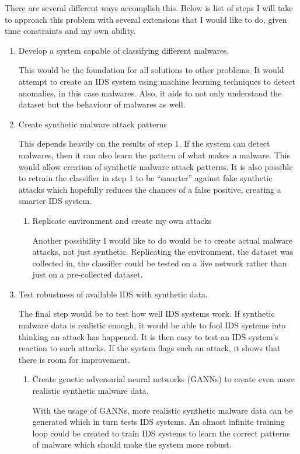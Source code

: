 \documentclass[11pt]{article}
\begin{document}
There are several different ways accomplish this. Below is list of steps I will take to approach this problem with several extensions that I would like to do, given time constraints and my own ability. 

\begin{enumerate}
  \item Develop a system capable of classifying different malwares. 
  
 This would be the foundation for all solutions to other problems. It would attempt to create an IDS system using machine learning techniques to detect anomalies, in this case malwares. Also, it aids to not only understand the dataset but the behaviour of malwares as well. 

  \item Create synthetic malware attack patterns

  This depends heavily on the results of step 1. If the system can detect malwares, then it can also learn the pattern of what makes a malware. This would allow creation of synthetic malware attack patterns. It is also possible to retrain the classifier in step 1 to be “smarter” against fake synthetic attacks which hopefully reduces the chances of a false positive, creating a smarter IDS system. 

  \begin{enumerate}
    \item{Replicate environment and create my own attacks}

   Another possibility I would like to do would be to create actual malware attacks, not just synthetic. Replicating the environment, the dataset was collected in, the classifier could be tested on a live network rather than just on a pre-collected dataset. 
  \end{enumerate}  

  \item Test robustness of available IDS with synthetic data.

 The final step would be to test how well IDS systems work. If synthetic malware data is realistic enough, it would be able to fool IDS systems into thinking an attack has happened. It is then easy to test an IDS system’s reaction to such attacks. If the system flags such an attack, it shows that there is room for improvement. 

  \begin{enumerate}
    \item{Create genetic adversarial neural networks (GANNs) to create even more realistic synthetic malware data.}

   With the usage of GANNs, more realistic synthetic malware data can be generated which in turn tests IDS systems. An almost infinite training loop could be created to train IDS systems to learn the correct patterns of malware which should make the system more robust. 
  \end{enumerate}  
\end{enumerate}
\end{document}
